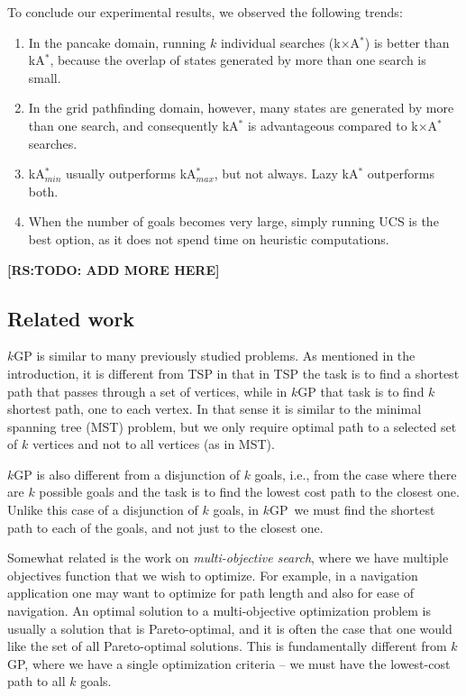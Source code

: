 \documentclass{aicom2e}
\newcommand{\kgs}{$k$GP}
\newcommand{\kastar}{kA$^*$}
\newcommand{\kastarmin}{kA$^*_{min}$}
\newcommand{\kastarmax}{kA$^*_{max}$}
\newcommand{\kxastar}{k$\times$A$^*$}
\newcommand{\roni}[1]{\textbf{[RS:#1]}}
\begin{document}
To conclude our experimental results, we observed the following trends:
\begin{enumerate}
    \item In the pancake domain, running $k$ individual searches (\kxastar{}) is better than \kastar{}, because the overlap of states generated by more than one search is small.
    \item In the grid pathfinding domain, however, many states are generated by more than one search, and consequently \kastar{} is advantageous compared to \kxastar{} searches.
    \item \kastarmin{} usually outperforms \kastarmax{}, but not always. Lazy \kastar{} outperforms both.
    \item When the number of goals becomes very large, simply running UCS is the best option, as it does not spend time on heuristic computations.
\end{enumerate}

\roni{TODO: ADD MORE HERE}




\subsection{Related work}
\label{sec:related-work}

\kgs{} is similar to many previously studied problems. As mentioned in the introduction, it is different from TSP in that in TSP the task is to find a shortest path that passes through a set of vertices, while in \kgs{} that task is to find $k$ shortest path, one to each vertex. In that sense it is similar to the minimal spanning tree (MST) problem, but we only require optimal path to a selected set of $k$ vertices and not to all vertices (as in MST). 


\kgs{} is also different from a disjunction of $k$ goals, i.e., from the case where there are $k$ possible goals and the task is to find the lowest cost path to the closest one. Unlike this case of a disjunction of $k$ goals, in \kgs\ we must find the shortest path to each of the goals, and not just to the closest one.

Somewhat related is the work on {\em multi-objective search}, where we have multiple objectives function that we wish to optimize. For example, in a navigation application one may want to optimize for path length and also for ease of navigation. An optimal solution to a multi-objective optimization problem is usually a solution that is Pareto-optimal, and it is often the case that one would like the set of all Pareto-optimal solutions. This is fundamentally different from \kgs{}, where we have a single optimization criteria -- we must have the lowest-cost path to all $k$ goals. 
\end{document}
